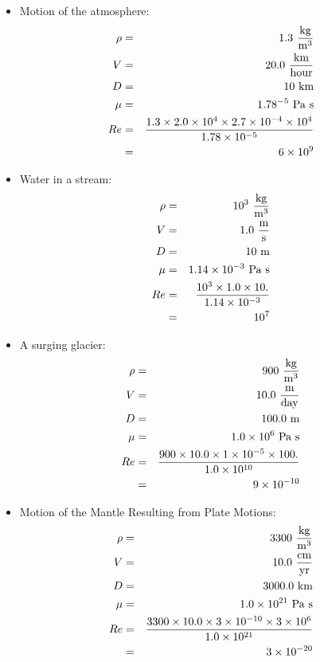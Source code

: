 \documentclass[12pt,twoside]{article}
\begin{document}
\begin{itemize}
\item Motion of the atmosphere:
\begin{eqnarray*}
\rho & = & 1.3~{{\rm kg}\over{\rm m^3}} \\ 
V    & = & 20.0~{{\rm km}\over{\rm hour}}    \\ 
D    & = & 10~{\rm km} \\
\mu  & = & 1.78 \time 10^{-5}~{\rm Pa~s} \\ 
Re   & = & {{1.3 \times 2.0 \times 10^4 \times 2.7 \times 10^{-4} \times 10^4 }
\over {1.78 \times 10^{-5}} } \\
     & = & 6 \times 10^{9}
\end{eqnarray*}

\item Water in a stream:
\begin{eqnarray*}
\rho & = & 10^3~{{\rm kg}\over{\rm m^3}} \\
V    & = & 1.0~{{\rm m}\over{\rm s}}    \\
D    & = & 10~{\rm m} \\
\mu  & = & 1.14\times 10^{-3}~{\rm Pa~s} \\
Re   & = & {{10^3 \times 1.0 \times 10.} \over {1.14 \times 10^{-3}} } \\
     & = & 10^7
\end{eqnarray*}

\item A surging glacier:
\begin{eqnarray*}
\rho & = & 900~{{\rm kg}\over{\rm m^3}} \\ 
V    & = & 10.0~{{\rm m}\over{\rm day}}    \\ 
D    & = & 100.0~{\rm m} \\
\mu  & = & 1.0\times 10^{6}~{\rm Pa~s} \\ 
Re   & = & {{900 \times 10.0 \times 1 \times 10^{-5} \times 100. } \over {1.0
\times 10^{10} }} \\
     & = & 9 \times 10^{-10}
\end{eqnarray*}

\item Motion of the Mantle Resulting from Plate Motions:
\begin{eqnarray*}
\rho & = & 3300~{{\rm kg}\over{\rm m^3}} \\  
V    & = & 10.0~{{\rm cm}\over{\rm yr}}    \\  
D    & = & 3000.0~{\rm km} \\
\mu  & = & 1.0\times 10^{21}~{\rm Pa~s} \\  
Re   & = & {{3300 \times 10.0 \times 3 \times 10^{-10} \times 3\times 10^6 }
\over {1.0 \times 10^{21} }} \\
     & = & 3 \times 10^{-20}
\end{eqnarray*}

\end{itemize}
\end{document}
